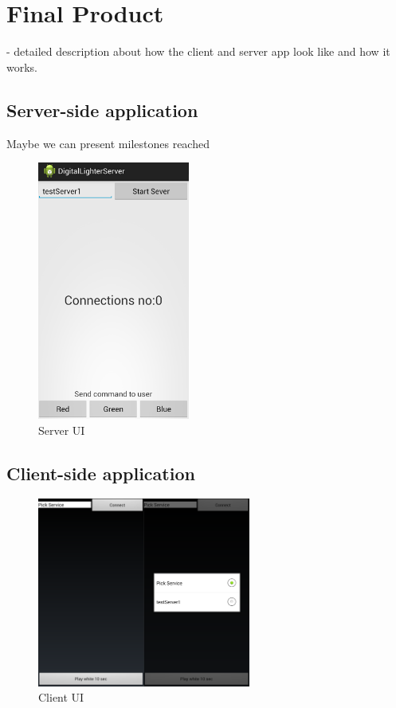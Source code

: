 
\section{Final Product}
- detailed description about how the client and server app look like and how it works.

\subsection{Server-side application}

Maybe we can present milestones reached

\begin{figure}[H]
	\centering
		\includegraphics[width=5cm]{conclusion/server_ui.png}
	\caption{Server UI}
	\label{fig:Server_UI }
\end{figure}

\subsection{Client-side application}
\begin{figure}[H]
	\centering
		\includegraphics[width=7cm]{conclusion/user_ui.png}
	\caption{Client UI}
	\label{fig:Client_UI }
\end{figure}

